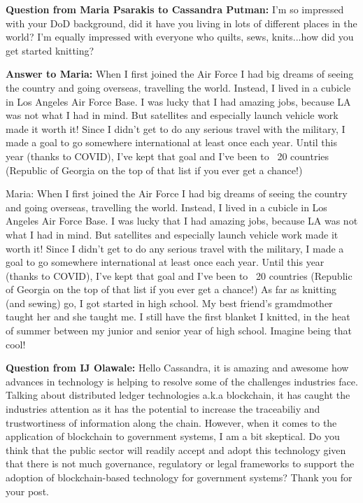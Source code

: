 \textbf{Question from Maria Psarakis to Cassandra Putman:} I'm so impressed with your DoD background, did it have you living in lots of different places in the world? I'm equally impressed with everyone who quilts, sews, knits...how did you get started knitting? 

\textbf{Answer to Maria:} When I first joined the Air Force I had big dreams of seeing the country and going overseas, travelling the world.  Instead, I lived in a cubicle in Los Angeles Air Force Base. I was lucky that I had amazing jobs, because LA was not what I had in mind.  But satellites and especially launch vehicle work made it worth it!  Since I didn't get to do any serious travel with the military, I made a goal to go somewhere international at least once each year.  Until this year (thanks to COVID), I've kept that goal and I've been to ~20 countries (Republic of Georgia on the top of that list if you ever get a chance!) 

Maria: When I first joined the Air Force I had big dreams of seeing the country and going overseas, travelling the world.  Instead, I lived in a cubicle in Los Angeles Air Force Base. I was lucky that I had amazing jobs, because LA was not what I had in mind.  But satellites and especially launch vehicle work made it worth it!  Since I didn't get to do any serious travel with the military, I made a goal to go somewhere international at least once each year.  Until this year (thanks to COVID), I've kept that goal and I've been to ~20 countries (Republic of Georgia on the top of that list if you ever get a chance!) 
As far as knitting (and sewing) go, I got started in high school. My best friend's gramdmother taught her and she taught me. I still have the first blanket I knitted, in the heat of summer between my junior and senior year of high school. Imagine being that cool! 

\textbf{Question from IJ Olawale:} Hello Cassandra, it is amazing and awesome how advances in technology is helping to resolve some of the challenges industries face. Talking about distributed ledger technologies a.k.a blockchain, it has caught the industries attention as it has the potential to increase the traceabiliy and trustwortiness of information along the chain. However, when it comes to the application of blockchain to government systems, I am a bit skeptical. Do you think that the public sector  will readily accept and adopt this technology given that there is not much governance, regulatory or legal frameworks to support the adoption of blockchain-based technology for government systems? Thank you for your post.


